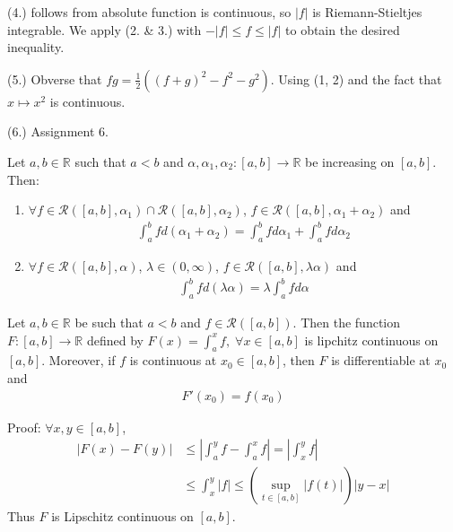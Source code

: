 \documentclass{tufte-handout}
\begin{document}
(4.) follows from absolute function is continuous, so
\( |f| \) is Riemann-Stieltjes integrable. 
We apply (2. \& 3.) with \(-|f| \leq f \leq |f| \) to obtain the desired inequality.

(5.) Obverse that \( fg = \frac{1}{2}((f+g)^2 - f^2 - g^2) \). 
Using (1, 2) and the fact that \(x\mapsto x^2\) is continuous.

(6.) Assignment 6.
\hfill \qedsymbol



\begin{Proposition}
    Let \( a,b \in \mathbb{R} \) such that \( a<b \)
    and \(\alpha, \alpha_1, \alpha_2: [a,b] \to \mathbb{R} \)
    be increasing on \([a,b]\). Then:
    \begin{enumerate}
        \item \( \forall f \in \mathcal{R}([a,b], \alpha_1) \cap \mathcal{R}([a,b], \alpha_2) \),
        \( f \in \mathcal{R}([a,b], \alpha_1 + \alpha_2) \) and
        \begin{align}
            \int_{a}^b fd(\alpha_1 + \alpha_2) = \int_{a}^b fd\alpha_1 + \int_{a}^b fd\alpha_2
        \end{align}
        \item \( \forall f \in \mathcal{R}([a,b], \alpha) \), \(\lambda \in (0,\infty)\), 
        \( f \in \mathcal{R}([a,b], \lambda \alpha) \) and
        \begin{align}
            \int_{a}^b fd(\lambda \alpha) = \lambda \int_{a}^b fd\alpha
        \end{align}
    \end{enumerate}
\end{Proposition}


\begin{Theorem}
    Let \( a,b \in \mathbb{R} \) be such that \( a<b \) and 
    \(f\in \mathcal{R}([a,b])\). Then the function \( F: [a,b] \to \mathbb{R} \) defined 
    by \( F(x) = \int_{a}^x f , \; \forall x \in [a,b] \) is 
    lipchitz continuous on \([a,b]\). Moreover, 
    if \( f \) is continuous at \( x_0 \in [a,b] \), then \( F \) is differentiable at \( x_0 \) and
    \begin{align}
        F'(x_0) = f(x_0)
    \end{align}
\end{Theorem}
Proof: \( \forall x,y \in [a,b] \), 
\begin{align}
|F(x) - F(y)| &\leq |\int_{a}^{y}f - \int_{a}^{x}f| =|\int_{x}^{y}f| \\
&\leq \int_{x}^{y} |f| \leq \left(\sup_{t \in [a,b]}|f(t)|\right) |y-x|
\end{align}
Thus \( F \) is Lipschitz continuous on \([a,b]\).
\end{document}

